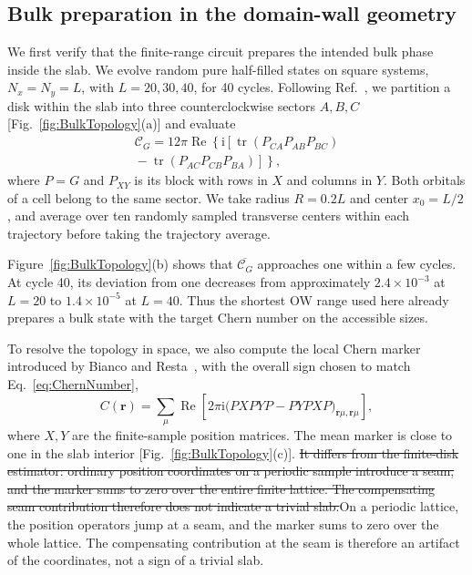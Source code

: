 \documentclass[aps,prb,10pt,twocolumn,superscriptaddress,longbibliography,floatfix]{revtex4-2}
\newcommand{\ii}{\mathrm{i}}
\newcommand{\mc}[1]{\mathcal{#1}}
\newcommand{\bfr}{\boldsymbol r}
\newcommand{\claudeadd}[1]{{\color{orange}#1}}
\newcommand{\claudedel}[1]{{\color{orange}\sout{#1}}}
\begin{document}
{\color{blue}
\subsection{Bulk preparation in the domain-wall geometry}
\label{sec:BulkTopology}

We first verify that the finite-range circuit prepares the intended bulk phase inside the slab. We evolve random pure half-filled states on square systems, $N_x=N_y=L$, with $L=20,30,40$, for 40 cycles. Following Ref.~\cite{Kitaev2006}, we partition a disk within the slab into three counterclockwise sectors $A,B,C$ [Fig.~\ref{fig:BulkTopology}(a)] and evaluate
\begin{align}
    \mc C_G=12\pi\operatorname{Re}\!\left\{\ii\left[\operatorname{tr}(P_{CA}P_{AB}P_{BC})\right.\right.\nonumber\\
    \left.\left.{}-\operatorname{tr}(P_{AC}P_{CB}P_{BA})\right]\right\},
    \label{eq:KitaevChern}
\end{align}
where \claudeadd{$P=G$} and $P_{XY}$ is its block with rows in $X$ and columns in $Y$. Both orbitals of a cell belong to the same sector. We take radius $R=0.2L$ and center $x_0=L/2$, and average over ten randomly sampled transverse centers within each trajectory before taking the trajectory average.

Figure~\ref{fig:BulkTopology}(b) shows that $\overline{\mc C_G}$ approaches one within a few cycles. At cycle 40, its deviation from one decreases from approximately $2.4\times10^{-3}$ at $L=20$ to $1.4\times10^{-5}$ at $L=40$. Thus the shortest OW range used here already prepares a bulk state with the target Chern number on the accessible sizes.

To resolve the topology in space, we also compute the local Chern marker introduced by Bianco and Resta~\cite{BiancoResta2011}, with the overall sign chosen to match Eq.~\eqref{eq:ChernNumber},
\begin{equation}
 C(\bfr)=\sum_\mu\operatorname{Re}\!\left[2\pi\ii\big(PXPYP-PYPXP\big)_{\bfr\mu,\bfr\mu}\right],
 \label{eq:LocalMarker}
\end{equation}
where $X,Y$ are the finite-sample position matrices. The mean marker is close to one in the slab interior [Fig.~\ref{fig:BulkTopology}(c)]. \claudedel{It differs from the finite-disk estimator: ordinary position coordinates on a periodic sample introduce a seam, and the marker sums to zero over the entire finite lattice. The compensating seam contribution therefore does not indicate a trivial slab.}\claudeadd{On a periodic lattice, the position operators jump at a seam, and the marker sums to zero over the whole lattice. The compensating contribution at the seam is therefore an artifact of the coordinates, not a sign of a trivial slab.}
}
\end{document}

